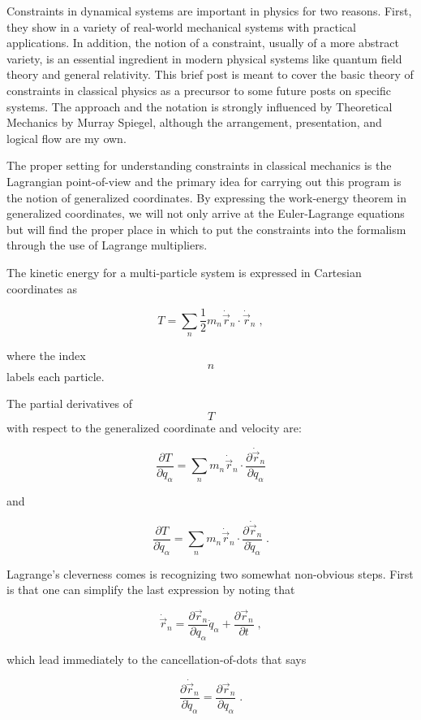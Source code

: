 \documentclass[12pt]{article}
\begin{document}
Constraints in dynamical systems are important in physics for two reasons.  First, they show in a variety of real-world mechanical systems with practical applications.  In addition, the notion of a constraint, usually of a more abstract variety, is an essential ingredient in modern physical systems like quantum field theory and general relativity.  This brief post is meant to cover the basic theory of constraints in classical physics as a precursor to some future posts on specific systems.  The approach and the notation is strongly influenced by Theoretical Mechanics by Murray Spiegel, although the arrangement, presentation, and logical flow are my own.

The proper setting for understanding constraints in classical mechanics is the Lagrangian point-of-view and the primary idea for carrying out this program is the notion of generalized coordinates.  By expressing the work-energy theorem in generalized coordinates, we will not only arrive at the Euler-Lagrange equations but will find the proper place in which to put the constraints into the formalism through the use of Lagrange multipliers.

The kinetic energy for a multi-particle system is expressed in Cartesian coordinates as 

\[ T = \sum_n \frac{1}{2} m_n {\dot {\vec r}}_n \cdot {\dot {\vec r}}_n \; , \]

where the index $$n$$ labels each particle.

The partial derivatives of $$T$$ with respect to the generalized coordinate and velocity are:

\[ \frac{\partial T}{\partial q_{\alpha}} = \sum_n m_n {\dot {\vec r}}_n \cdot \frac{\partial {\dot {\vec r}}_n}{\partial q_{\alpha}} \]

and

\[ \frac{\partial T}{\partial {\dot q}_{\alpha}} = \sum_n m_n {\dot {\vec r}}_n \cdot \frac{\partial {\dot {\vec r}}_n}{\partial {\dot q}_{\alpha}} \; .\]

Lagrange's cleverness comes is recognizing two somewhat non-obvious steps.  First is that one can simplify the last expression by noting that

\[ {\dot {\vec r}}_n = \frac{\partial {\vec r}_n}{\partial q_{\alpha}} {\dot q}_{\alpha} + \frac{\partial {\vec r}_n}{\partial t} \; , \]

which lead immediately to the cancellation-of-dots that says

\[ \frac{\partial {\dot {\vec r}}_n}{\partial {\dot q}_{\alpha}} = \frac{\partial {{\vec r}}_n}{\partial {q}_{\alpha}} \; .\]
\end{document}
